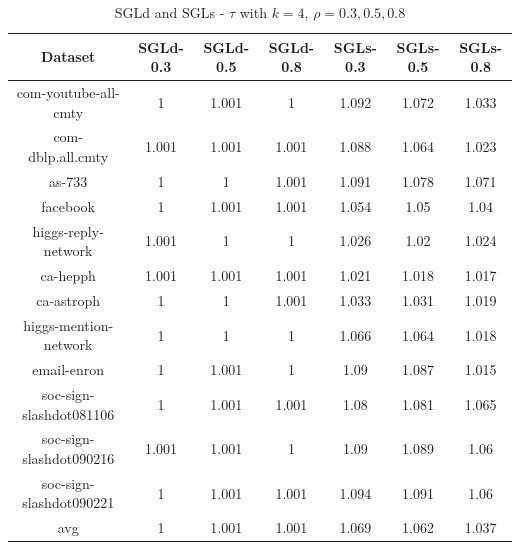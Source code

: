 \documentclass{sig-alternate-2013}
\begin{document}
\begin{table}[!hpp]
\centering
\caption{SGLd and SGLs - $\tau$ with $k=4$, $\rho = 0.3, 0.5, 0.8$}
\begin{tabular}{ccccccc}
\hline
Dataset                     &SGLd-0.3       &SGLd-0.5       &SGLd-0.8       &SGLs-0.3       &SGLs-0.5       &SGLs-0.8\\
\hline
com-youtube-all-cmty&1&1.001&1&1.092&1.072&1.033\\
com-dblp.all.cmty&1.001&1.001&1.001&1.088&1.064&1.023\\
as-733&1&1&1.001&1.091&1.078&1.071\\
facebook&1&1.001&1.001&1.054&1.05&1.04\\
higgs-reply-network&1.001&1&1&1.026&1.02&1.024\\
ca-hepph&1.001&1.001&1.001&1.021&1.018&1.017\\
ca-astroph&1&1&1.001&1.033&1.031&1.019\\
higgs-mention-network&1&1&1&1.066&1.064&1.018\\
email-enron&1&1.001&1&1.09&1.087&1.015\\
soc-sign-slashdot081106&1&1.001&1.001&1.08&1.081&1.065\\
soc-sign-slashdot090216&1.001&1.001&1&1.09&1.089&1.06\\
soc-sign-slashdot090221&1&1.001&1.001&1.094&1.091&1.06\\
\hline
avg&1&1.001&1.001&1.069&1.062&1.037\\
\hline
\end{tabular}
\end{table}
\end{document}
